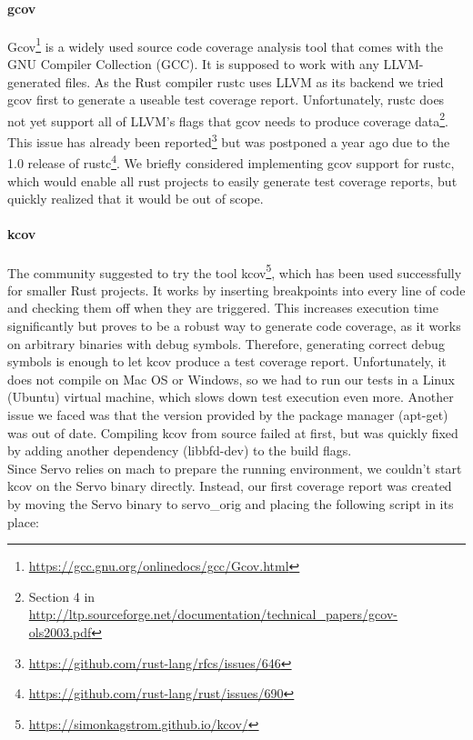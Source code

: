 \documentclass{scrartcl}
\begin{document}
\paragraph{gcov}
Gcov\footnote{\url{https://gcc.gnu.org/onlinedocs/gcc/Gcov.html}} is a widely used source code coverage analysis tool that comes with the GNU Compiler Collection (GCC). It is supposed to work with any LLVM-generated files. As the Rust compiler rustc uses LLVM as its backend we tried gcov first to generate a useable test coverage report. Unfortunately, rustc does not yet support all of LLVM's flags that gcov needs to produce coverage data\footnote{Section 4 in \url{http://ltp.sourceforge.net/documentation/technical_papers/gcov-ols2003.pdf}}. This issue has already been reported\footnote{\url{https://github.com/rust-lang/rfcs/issues/646}} but was postponed a year ago due to the 1.0 release of rustc\footnote{\url{https://github.com/rust-lang/rust/issues/690}}. We briefly considered implementing gcov support for rustc, which would enable all rust projects to easily generate test coverage reports, but quickly realized that it would be out of scope.

\paragraph{kcov}
The community suggested to try the tool kcov\footnote{\url{https://simonkagstrom.github.io/kcov/}}, which has been used successfully for smaller Rust projects. It works by inserting breakpoints into every line of code and checking them off when they are triggered. This increases execution time significantly but proves to be a robust way to generate code coverage, as it works on arbitrary binaries with debug symbols. Therefore, generating correct debug symbols is enough to let kcov produce a test coverage report. Unfortunately, it does not compile on Mac OS or Windows, so we had to run our tests in a Linux (Ubuntu) virtual machine, which slows down test execution even more. Another issue we faced was that the version provided by the package manager (apt-get) was out of date. Compiling kcov from source failed at first, but was quickly fixed by adding another dependency (libbfd-dev) to the build flags.\\

Since Servo relies on mach to prepare the running environment, we couldn't start kcov on the Servo binary directly. Instead, our first coverage report was created by moving the Servo binary to servo\_orig and placing the following script in its place:
\end{document}
